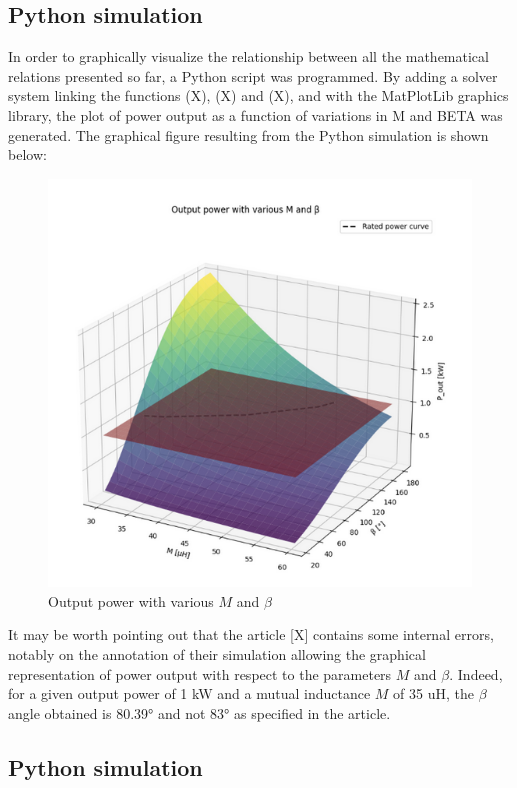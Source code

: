 \documentclass[conference]{IEEEtran}
\begin{document}
\subsection{Python simulation}
In order to graphically visualize the relationship between all the mathematical relations
presented so far, a Python script was programmed. By adding a solver system linking the
functions (X), (X) and (X), and with the MatPlotLib graphics library, the plot of power
output as a function of variations in M and BETA was generated. The graphical figure
resulting from the Python simulation is shown below:
\begin{figure}[htbp]
	\centerline{\includegraphics[width=\linewidth]{images/7.png}}
	\caption{Output power with various \(M\) and \(\beta\)}
	\label{fig}
\end{figure}
It may be worth pointing out that the article [X] contains some internal errors, notably on
the annotation of their simulation allowing the graphical representation of power output
with respect to the parameters \(M\) and \(\beta\). Indeed, for a given output power of 1 kW and
a mutual inductance \(M\) of 35 uH, the \(\beta\) angle obtained is 80.39° and not 83° as
specified in the article.

\subsection{Python simulation}
\end{document}
